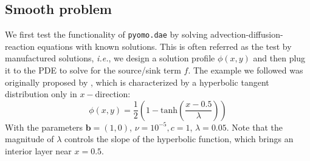 \documentclass{article}
\begin{document}
\subsection{Smooth problem}
We first test the functionality of \texttt{pyomo.dae} by solving advection-diffusion-reaction equations with known solutions. This is often referred as the test by manufactured solutions, {\it{i.e.}}, we design a solution profile $\phi(x,y)$ and then plug it to the PDE to solve for the source/sink term $f$. The example we followed was originally proposed by \cite{burman2004edge}, which is characterized by a hyperbolic tangent distribution only in $x-$direction: $$\phi(x,y) = \frac{1}{2} (1-\text{tanh}(\frac{x - 0.5}{\lambda}))$$
With the parameters $\mathbf{b} = (1,0)$, $\nu=10^{-5}, c = 1$, $\lambda = 0.05$. Note that the magnitude of $\lambda$ controls the slope of the hyperbolic function, which brings an interior layer near $x=0.5$. 
\end{document}
